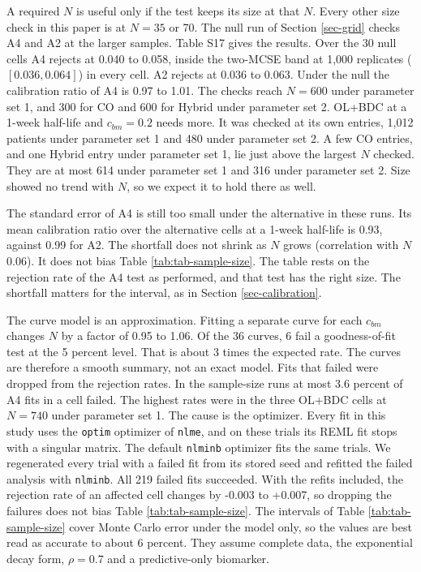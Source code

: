 \documentclass[
  11pt,
]{article}
\begin{document}
A required \(N\) is useful only if the test keeps its size at that \(N\).
Every other size check in this paper is at \(N = 35\) or 70. The null
run of Section \ref{sec-grid} checks A4 and A2 at the larger
samples. Table S17 gives the results. Over the
30 null cells A4
rejects at 0.040 to 0.058, inside
the two-MCSE band at 1,000 replicates
(\([0.036, 0.064]\)) in every cell. A2 rejects
at 0.036 to 0.063. Under the
null the calibration ratio of A4 is
0.97 to
1.01. The checks reach
\(N = 600\) under parameter set 1, and 300 for CO and 600 for Hybrid
under parameter set 2.
OL+BDC at a 1-week half-life and \(c_{bm} = 0.2\) needs more. It was
checked at its own entries,
1,012
patients under parameter set 1 and
480
under parameter set 2. A few CO entries, and one Hybrid entry under
parameter set 1, lie just above the largest \(N\) checked. They are at
most
614 under parameter set 1 and
316 under parameter set 2.
Size showed no trend with \(N\), so we expect it to hold there as well.

The standard error of A4 is still too small under the alternative in
these runs. Its mean calibration ratio over the alternative cells at a
1-week half-life is 0.93,
against 0.99 for A2. The shortfall
does not shrink as \(N\) grows (correlation with \(N\)
0.06). It does not bias Table
\ref{tab:tab-sample-size}. The table rests on the rejection rate of
the A4 test as performed, and that test has the right size. The
shortfall matters for the interval, as in Section
\ref{sec-calibration}.

The curve model is an approximation. Fitting a separate curve for each
\(c_{bm}\) changes \(N\) by a factor of
0.95 to 1.06.
Of the 36 curves, 6 fail a
goodness-of-fit test at the 5 percent level. That is about
3
times the expected rate. The curves are therefore a smooth summary,
not an exact model. Fits that failed were dropped from the rejection
rates. In the sample-size runs at most
3.6
percent of A4 fits in a cell failed. The highest rates were in the
three OL+BDC cells at \(N = 740\) under parameter set 1. The cause
is the optimizer. Every fit in this study uses the \texttt{optim} optimizer
of \texttt{nlme}, and on these trials its REML fit stops with a singular
matrix. The default \texttt{nlminb} optimizer fits the same trials. We
regenerated every trial with a failed fit from its stored seed and
refitted the failed analysis with \texttt{nlminb}. All
219 failed fits succeeded. With the refits included, the
rejection rate of an affected cell changes by
-0.003 to
+0.007, so dropping the failures does
not bias Table \ref{tab:tab-sample-size}. The intervals of Table
\ref{tab:tab-sample-size} cover Monte Carlo error under the model
only, so the values are best read as accurate to about 6 percent.
They assume complete data, the exponential decay form, \(\rho = 0.7\)
and a predictive-only biomarker.
\end{document}
